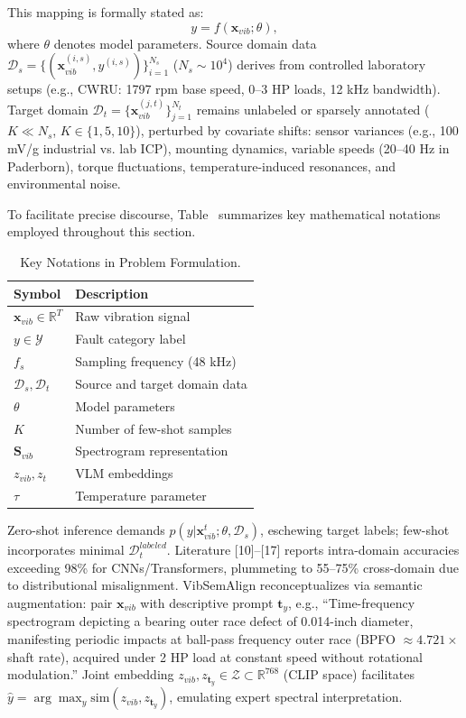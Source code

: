 This mapping is formally stated as:
\begin{equation}
y = f(\mathbf{x}_{vib}; \theta),
\label{eq:f1}
\end{equation}
where $\theta$ denotes model parameters. Source domain data $\mathcal{D}_s = \{(\mathbf{x}_{vib}^{(i,s)}, y^{(i,s)})\}_{i=1}^{N_s}$ ($N_s \sim 10^4$) derives from controlled laboratory setups (e.g., CWRU: 1797 rpm base speed, 0--3 HP loads, 12 kHz bandwidth). Target domain $\mathcal{D}_t = \{\mathbf{x}_{vib}^{(j,t)}\}_{j=1}^{N_t}$ remains unlabeled or sparsely annotated ($K \ll N_s$, $K\in\{1,5,10\}$), perturbed by covariate shifts: sensor variances (e.g., 100 mV/g industrial vs. lab ICP), mounting dynamics, variable speeds (20--40 Hz in Paderborn), torque fluctuations, temperature-induced resonances, and environmental noise.

To facilitate precise discourse, Table~ summarizes key mathematical notations employed throughout this section.

\begin{table}[t]
\centering
\caption{Key Notations in Problem Formulation.}
\label{tab:notation}
\begin{tabular}{@{}ll@{}}
\toprule
Symbol & Description \\
\midrule
$\mathbf{x}_{vib} \in \mathbb{R}^T$ & Raw vibration signal \\
$y \in \mathcal{Y}$ & Fault category label \\
$f_s$ & Sampling frequency (48 kHz) \\
$\mathcal{D}_s, \mathcal{D}_t$ & Source and target domain data \\
$\theta$ & Model parameters \\
$K$ & Number of few-shot samples \\
$\mathbf{S}_{vib}$ & Spectrogram representation \\
$z_{vib}, z_t$ & VLM embeddings \\
$\tau$ & Temperature parameter \\
\bottomrule
\end{tabular}
\end{table}

Zero-shot inference demands $p(y|\mathbf{x}_{vib}^t; \theta, \mathcal{D}_s)$, eschewing target labels; few-shot incorporates minimal $\mathcal{D}_t^{labeled}$. Literature [10]--[17] reports intra-domain accuracies exceeding 98\% for CNNs/Transformers, plummeting to 55--75\% cross-domain due to distributional misalignment. VibSemAlign reconceptualizes via semantic augmentation: pair $\mathbf{x}_{vib}$ with descriptive prompt $\mathbf{t}_y$, e.g., ``Time-frequency spectrogram depicting a bearing outer race defect of 0.014-inch diameter, manifesting periodic impacts at ball-pass frequency outer race (BPFO $\approx 4.721 \times$ shaft rate), acquired under 2 HP load at constant speed without rotational modulation.'' Joint embedding $z_{vib}, z_{\mathbf{t}_y} \in \mathcal{Z} \subset \mathbb{R}^{768}$ (CLIP space) facilitates $\hat{y} = \arg\max_y \mathrm{sim}(z_{vib}, z_{\mathbf{t}_y})$, emulating expert spectral interpretation.

